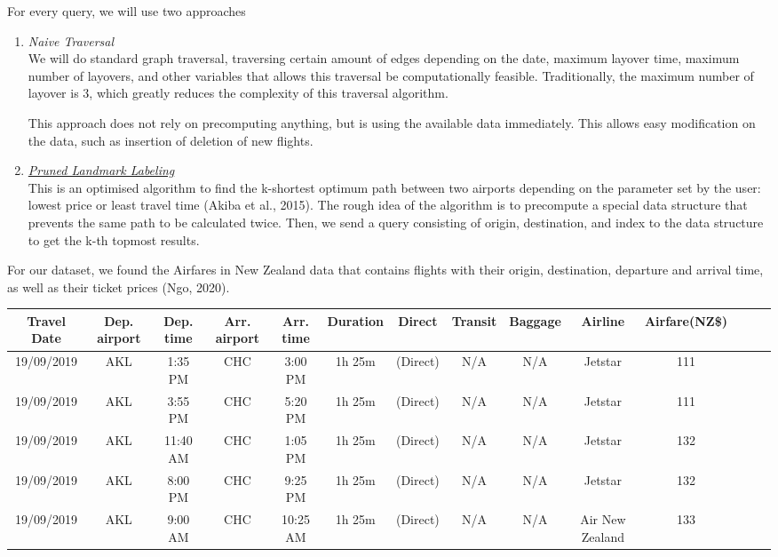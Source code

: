 \documentclass[11pt]{article}
\begin{document}
For every query, we will use two approaches
\begin{enumerate}
\item \textit{Naive Traversal} \\
We will do standard graph traversal, traversing certain amount of edges depending on the date, maximum layover time, maximum number of layovers, and other variables that allows this traversal be computationally feasible. Traditionally, the maximum number of layover is $3$, which greatly reduces the complexity of this traversal algorithm.

This approach does not rely on precomputing anything, but is using the available data immediately. This allows easy modification on the data, such as insertion of deletion of new flights.


\item \href{https://ojs.aaai.org/index.php/AAAI/article/view/9154}{\textit{Pruned Landmark Labeling}} \\
This is an optimised algorithm to find the k-shortest optimum path between two airports depending on the parameter set by the user: lowest price or least travel time (Akiba et al., 2015). The rough idea of the algorithm is to precompute a special data structure that prevents the same path to be calculated twice. Then, we send a query consisting of origin, destination, and index to the data structure to get the k-th topmost results.
\end{enumerate}

For our dataset, we found the Airfares in New Zealand data that contains flights with their origin, destination, departure and arrival time, as well as their ticket prices (Ngo, 2020).

\vspace{1em}

\tiny
\begin{tabular}{|c|c|c|c|c|c|c|c|c|c|c|c|c|c|}
\hline
    Travel Date	& Dep. airport & Dep. time & Arr. airport & Arr. time & Duration & Direct & Transit & Baggage & Airline & Airfare(NZ\$) \\
\hline
19/09/2019 & AKL & 1:35 PM  & CHC & 3:00 PM  & 1h 25m & (Direct) & N/A & N/A & Jetstar & 111 \\
\hline
19/09/2019 & AKL & 3:55 PM  & CHC & 5:20 PM  & 1h 25m & (Direct) & N/A & N/A & Jetstar & 111 \\
\hline
19/09/2019 & AKL & 11:40 AM & CHC & 1:05 PM  & 1h 25m & (Direct) & N/A & N/A & Jetstar & 132 \\
\hline
19/09/2019 & AKL & 8:00 PM  & CHC & 9:25 PM  & 1h 25m & (Direct) & N/A & N/A & Jetstar & 132 \\
\hline
19/09/2019 & AKL & 9:00 AM  & CHC & 10:25 AM & 1h 25m & (Direct) & N/A & N/A & Air New Zealand & 133 \\
\hline
\end{tabular}
\end{document}

